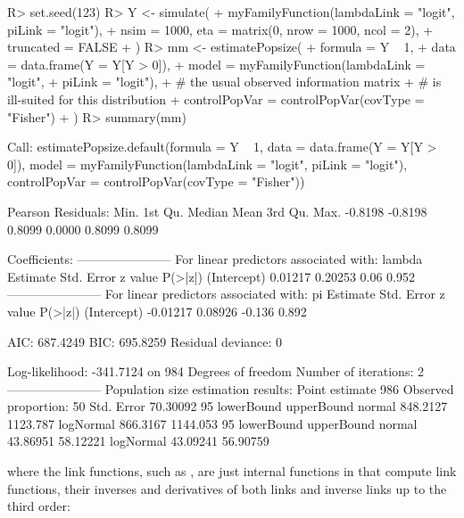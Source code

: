 \documentclass[nojss]{jss}
\newcommand{\1}{\mathcal{I}} \newcommand{\bZero}{\boldsymbol{0}}
\begin{document}
\begin{CodeChunk}
\begin{CodeInput}
R> set.seed(123)
R> Y <- simulate(
+     myFamilyFunction(lambdaLink = "logit", piLink = "logit"),
+     nsim = 1000, eta = matrix(0, nrow = 1000, ncol = 2),
+     truncated = FALSE
+ )
R> mm <- estimatePopsize(
+     formula = Y ~ 1,
+     data = data.frame(Y = Y[Y > 0]),
+     model = myFamilyFunction(lambdaLink = "logit",
+                              piLink = "logit"),
+     # the usual observed information matrix
+     # is ill-suited for this distribution
+     controlPopVar = controlPopVar(covType = "Fisher")
+ )
R> summary(mm)
\end{CodeInput}
\begin{CodeOutput}

Call:
estimatePopsize.default(formula = Y ~ 1, data = data.frame(Y = Y[Y >
    0]), model = myFamilyFunction(lambdaLink = "logit", piLink = "logit"),
    controlPopVar = controlPopVar(covType = "Fisher"))

Pearson Residuals:
   Min. 1st Qu.  Median    Mean 3rd Qu.    Max.
-0.8198 -0.8198  0.8099  0.0000  0.8099  0.8099

Coefficients:
-----------------------
For linear predictors associated with: lambda
            Estimate Std. Error z value P(>|z|)
(Intercept)  0.01217    0.20253    0.06   0.952
-----------------------
For linear predictors associated with: pi
            Estimate Std. Error z value P(>|z|)
(Intercept) -0.01217    0.08926  -0.136   0.892

AIC: 687.4249
BIC: 695.8259
Residual deviance: 0

Log-likelihood: -341.7124 on 984 Degrees of freedom
Number of iterations: 2
-----------------------
Population size estimation results:
Point estimate 986
Observed proportion: 50%
Std. Error 70.30092
95%
          lowerBound upperBound
normal      848.2127   1123.787
logNormal   866.3167   1144.053
95%
          lowerBound upperBound
normal      43.86951   58.12221
logNormal   43.09241   56.90759
\end{CodeOutput}
\end{CodeChunk}

where the link functions, such as
, are just internal
functions in  that compute link functions, their
inverses and derivatives of both links and inverse links up to the third
order: \small
\end{document}
